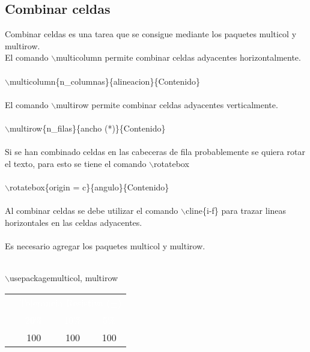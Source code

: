 \documentclass{article}
\begin{document}
	\subsection{Combinar celdas}
	Combinar celdas es una tarea que se consigue mediante los paquetes \textcolor{myGreen}{multicol} y \textcolor{myGreen}{multirow}.\\El comando \textcolor{myGreen}{$\backslash$multicolumn} permite combinar celdas adyacentes horizontalmente.\\\\\textcolor{myGreen}{$\backslash$multicolumn}\{n\_columnas\}\{alineacion\}\{Contenido\}\\\\
	El comando \textcolor{myGreen}{$\backslash$multirow} permite combinar celdas adyacentes verticalmente.\\\\\textcolor{myGreen}{$\backslash$multirow}\{n\_filas\}\{ancho (*)\}\{Contenido\}\\\\Si se han combinado celdas en las cabeceras de fila probablemente se quiera rotar el texto, para esto se tiene el comando \textcolor{myGreen}{$\backslash$rotatebox}\\\\\textcolor{myGreen}{$\backslash$rotatebox}\{origin = c\}\{angulo\}\{Contenido\}\\\\Al combinar celdas se debe utilizar el comando \textcolor{myGreen}{$\backslash$cline}\{i-f\} para trazar lineas horizontales en las celdas adyacentes.\\\\Es necesario agregar los paquetes multicol y multirow.\\\\\textcolor{myGreen}{$\backslash$usepackage{multicol, multirow}
	\begin{table}[ht]
		\centering
		\begin{tabular}{|>{\cellcolor{myBlue}}cccc|}
			\hline
			\rowcolor{blue254!75}
			& \multicolumn{3}{c|}{\textcolor{white}{Tolerancia Resistiva ($\pm$)}}\\
        \rowcolor{blue254!75}
        & \textcolor{white}{20\%} & \textcolor{white}{10\%} & \textcolor{white}{5\%} \\
        & \multirow{4}{*}{100} & \multirow{2}{*}{100} & 100 \\ 

\end{tabular}
\end{table}}
\end{document}
